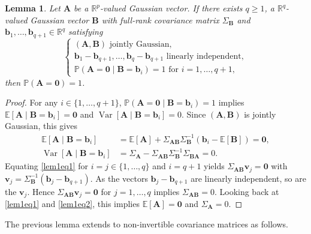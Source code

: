 \documentclass[11pt,a4paper]{article}
\newcommand{\R}{\mathbb{R}}
\newtheorem{lem}[thm]{Lemma}
\begin{document}
\begin{lem}
\label{lem1}
Let $\boldsymbol{A}$ be a $\R^p$-valued Gaussian vector. If there exists $q\geq 1$, a $\R^q$-valued Gaussian vector $\boldsymbol{B}$ with full-rank covariance matrix $\Sigma_{\boldsymbol{B}}$ and $\boldsymbol{b}_1,\dots,\boldsymbol{b}_{q+1}\in \R^q$ satisfying
$$
\left\{
\begin{array}{l}
(\boldsymbol{A},\boldsymbol{B}) \text{ jointly Gaussian}, \\
\boldsymbol{b}_1-\boldsymbol{b}_{q+1},\dots,\boldsymbol{b}_{q}-\boldsymbol{b}_{q+1} \text{ linearly independent}, \\
\mathbb{P}(\boldsymbol{A}=\bm 0\mid \boldsymbol{B}=\boldsymbol{b}_i)=1 \text{ for } i=1,\dots,q+1,
\end{array}
\right.
$$
then $\mathbb{P}(\boldsymbol{A}=\bm 0)=1$.
\end{lem}
\begin{proof}
For any $i\in\{1,\dots,q+1\}$, $\mathbb{P}(\boldsymbol{A}=\bm 0\mid \boldsymbol{B}=\boldsymbol{b}_i)=1$ implies $\mathbb{E}[\boldsymbol{A}\mid \boldsymbol{B}=\boldsymbol{b}_i]=\bm 0$ and $\operatorname{Var}[\boldsymbol{A}\mid \boldsymbol{B}=\boldsymbol{b}_i]=0$. Since $(\boldsymbol{A},\boldsymbol{B})$ is jointly Gaussian, this gives
\begin{align}
\mathbb{E}[\boldsymbol{A}\mid \boldsymbol{B}=\boldsymbol{b}_i]&=\mathbb{E}[\boldsymbol{A}]+\Sigma_{\boldsymbol{A}\boldsymbol{B}}\Sigma_{\boldsymbol{B}}^{-1}(\boldsymbol{b}_i-\mathbb{E}[\boldsymbol{B}])=\boldsymbol{0},\label{lem1eq1}\\
\operatorname{Var}[\boldsymbol{A}\mid \boldsymbol{B}=\boldsymbol{b}_i]&=\Sigma_{\boldsymbol{A}}-\Sigma_{\boldsymbol{A}\boldsymbol{B}}\Sigma_{\boldsymbol{B}}^{-1}\Sigma_{\boldsymbol{B}\boldsymbol{A}}=0.\label{lem1eq2}
\end{align}
Equating \eqref{lem1eq1} for $i=j\in\{1,\dots,q\}$ and $i=q+1$ yields $\Sigma_{\boldsymbol{A}\boldsymbol{B}}\boldsymbol{v}_j=\bm 0$ with $\boldsymbol{v}_j=\Sigma_{\boldsymbol{B}}^{-1}(\boldsymbol{b}_j-\boldsymbol{b}_{q+1})$. As the vectors $\boldsymbol{b}_j-\boldsymbol{b}_{q+1}$ are linearly independent, so are the $\boldsymbol{v}_j$. Hence $\Sigma_{\boldsymbol{A}\boldsymbol{B}}\boldsymbol{v}_j=\bm 0$ for $j=1,\dots,q$ implies $\Sigma_{\boldsymbol{A}\boldsymbol{B}}=0$. Looking back at \eqref{lem1eq1} and \eqref{lem1eq2}, this implies $\mathbb{E}[\boldsymbol{A}]=\bm 0$ and $\Sigma_{\boldsymbol{A}}=0$.
\end{proof}
The previous lemma extends to non-invertible covariance matrices as follows.
\end{document}
